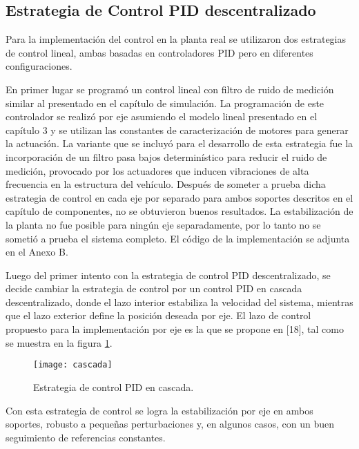 \documentclass[\main/main.tex]{subfiles}
\begin{document}
\subsection{Estrategia de Control PID descentralizado}

Para la implementación del control en la planta real se utilizaron
dos estrategias de control lineal, ambas basadas en controladores
PID pero en diferentes configuraciones. 

En primer lugar se programó un control lineal con filtro de ruido
de medición similar al presentado en el capítulo de simulación. La
programación de este controlador se realizó por eje asumiendo el modelo
lineal presentado en el capítulo 3 y se utilizan las constantes
de caracterización de motores para generar la actuación. La variante
que se incluyó para el desarrollo de esta estrategia fue la incorporación
de un filtro pasa bajos determinístico para reducir el ruido de medición,
provocado por los actuadores que inducen vibraciones de alta frecuencia
en la estructura del vehículo. Después de someter a prueba dicha estrategia
de control en cada eje por separado para ambos soportes descritos
en el capítulo de componentes, no se obtuvieron buenos resultados.
La estabilización de la planta no fue posible para ningún eje separadamente,
por lo tanto no se sometió a prueba el sistema completo. El código
de la implementación se adjunta en el Anexo B.

Luego del primer intento con la estrategia de control PID descentralizado,
se decide cambiar la estrategia de control por un control PID en cascada
descentralizado, donde el lazo interior estabiliza la velocidad del
sistema, mientras que el lazo exterior define la posición deseada por
eje. El lazo de control propuesto para la implementación por eje es
la que se propone en [18], tal como se muestra en la figura \ref{pid cascada}.

\begin{figure}[H]
\noindent \begin{centering}
\texttt{[image: cascada]}
\par\end{centering}
\caption{Estrategia de control PID en cascada.}\label{pid cascada}\noindent
\end{figure}

Con esta estrategia de control se logra la estabilización por eje
en ambos soportes, robusto a pequeñas perturbaciones y, en algunos
casos, con un buen seguimiento de referencias constantes.
\end{document}
